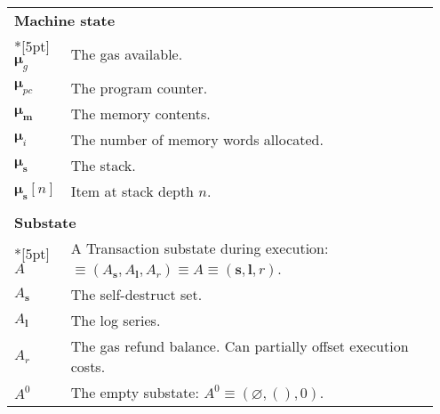 \documentclass[9pt,oneside]{amsart}
\begin{document}
\begin{longtable}{p{0.10\linewidth}p{0.85\linewidth}}
\vspace{5pt} \\
\midrule
\multicolumn{2}{l}{\textbf{Machine state}} \\*[5pt]
$\boldsymbol{\mu}_g$ & The gas available. \\
$\boldsymbol{\mu}_{pc}$ & The program counter. \\
$\boldsymbol{\mu}_\mathbf{m}$ & The memory contents. \\
$\boldsymbol{\mu}_i$ & The number of memory words allocated. \\
$\boldsymbol{\mu}_\mathbf{s}$ & The stack. \\
$\boldsymbol{\mu}_\mathbf{s}[n]$ & Item at stack depth $n$. \\

\vspace{5pt} \\
\midrule
\multicolumn{2}{l}{\textbf{Substate}} \\*[5pt]
$A$ & A Transaction substate during execution: $\equiv (A_\mathbf{s}, A_\mathbf{l}, A_r) \equiv A \equiv (\mathbf{s}, \mathbf{l}, r)$. \\
$A_\mathbf{s}$ & The self-destruct set. \\
$A_\mathbf{l}$ & The log series. \\
$A_r$ & The gas refund balance. Can partially offset execution costs.\\
$A^0$ & The empty substate: $A^0 \equiv (\varnothing, (), 0)$. \\


\end{longtable}
\end{document}
